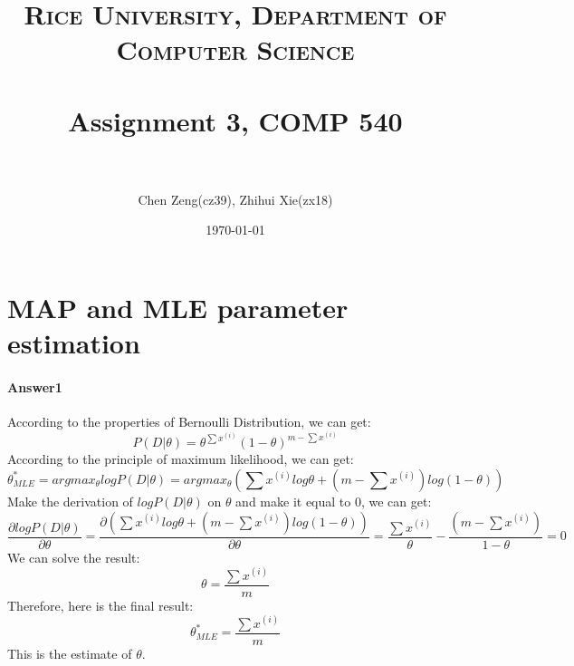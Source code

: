 \documentclass[paper=a4, fontsize=11pt]{scrartcl} %
\title{	
\normalfont \normalsize
\textsc{Rice University, Department of Computer Science} \\ [25pt] %
\horrule{0.5pt} \\[0.4cm] %
\huge Assignment 3, COMP 540 \\ %
\horrule{2pt} \\[0.5cm] %
}
\author{Chen Zeng(cz39), Zhihui Xie(zx18)} %
\date{\normalsize\today} %
\numberwithin{equation}{section} %
\numberwithin{figure}{section} %
\numberwithin{table}{section} %
\begin{document}
\maketitle %


\section{MAP and MLE parameter estimation}

\paragraph{\textbf{Answer1}}
According to the properties of Bernoulli Distribution, we can get:
\begin{equation*}
P\left ( D | \theta  \right )=\theta ^{\sum x^{\left ( i \right )}}\left ( 1-\theta  \right )^{m-\sum x^{\left ( i \right )}}
\end{equation*}
According to the principle of maximum likelihood, we can get:
\begin{equation*}
\theta _{MLE}^{\ast}=argmax_{\theta }logP\left ( D|\theta  \right )=argmax_{\theta }\left ( \sum x^{\left ( i \right )}log\theta +\left ( m-\sum x^{\left ( i \right )} \right )log\left ( 1-\theta  \right ) \right )
\end{equation*}
Make the derivation of $logP\left ( D|\theta  \right )$ on $\theta$ and make it equal to 0, we can get:
\begin{equation*}
\frac{\partial logP\left ( D|\theta  \right )}{\partial \theta }=\frac{\partial \left ( \sum x^{\left ( i \right )}log\theta +\left ( m-\sum x^{\left ( i \right )} \right )log\left ( 1-\theta  \right ) \right )}{\partial \theta }=\frac{\sum x^{\left ( i \right )}}{\theta }-\frac{\left ( m-\sum x^{\left ( i \right )} \right )}{1-\theta }=0
\end{equation*}
We can solve the result:
\begin{equation*}
\theta =\frac{\sum x^{\left ( i \right )}}{m}
\end{equation*}
Therefore, here is the final result:
\begin{equation*}
\theta _{MLE}^{\ast} =\frac{\sum x^{\left ( i \right )}}{m}
\end{equation*}
This is the estimate of $\theta$.
\end{document}
